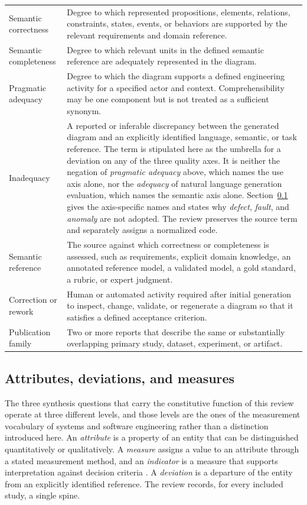 \begin{longtable}{p{} p{}}
Semantic correctness & Degree to which represented propositions, elements, relations, constraints, states, events, or behaviors are supported by the relevant requirements and domain reference. \\
Semantic completeness & Degree to which relevant units in the defined semantic reference are adequately represented in the diagram. \\
Pragmatic adequacy & Degree to which the diagram supports a defined engineering activity for a specified actor and context. Comprehensibility may be one component but is not treated as a sufficient synonym. \\
Inadequacy & A reported or inferable discrepancy between the generated diagram and an explicitly identified language, semantic, or task reference. The term is stipulated here as the umbrella for a deviation on any of the three quality axes. It is neither the negation of \textit{pragmatic adequacy} above, which names the use axis alone, nor the \textit{adequacy} of natural language generation evaluation, which names the semantic axis alone. Section~\ref{sec:protocol_attribute_deviation_measure} gives the axis-specific names and states why \textit{defect}, \textit{fault}, and \textit{anomaly} are not adopted. The review preserves the source term and separately assigns a normalized code. \\
Semantic reference & The source against which correctness or completeness is assessed, such as requirements, explicit domain knowledge, an annotated reference model, a validated model, a gold standard, a rubric, or expert judgment. \\
Correction or rework & Human or automated activity required after initial generation to inspect, change, validate, or regenerate a diagram so that it satisfies a defined acceptance criterion. \\
Publication family & Two or more reports that describe the same or substantially overlapping primary study, dataset, experiment, or artifact. \\
\bottomrule
\end{longtable}

\subsection{Attributes, deviations, and measures}
\label{sec:protocol_attribute_deviation_measure}

The three synthesis questions that carry the constitutive function of this review operate at three different levels, and those levels are the ones of the measurement vocabulary of systems and software engineering rather than a distinction introduced here. An \textit{attribute} is a property of an entity that can be distinguished quantitatively or qualitatively. A \textit{measure} assigns a value to an attribute through a stated measurement method, and an \textit{indicator} is a measure that supports interpretation against decision criteria \cite{ISO15939,ISO25020,SWEBOK2024}. A \textit{deviation} is a departure of the entity from an explicitly identified reference. The review records, for every included study, a single spine.

